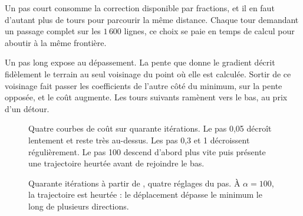 Un pas court consomme la correction disponible par fractions, et il en faut
d'autant plus de tours pour parcourir la même distance. Chaque tour demandant un
passage complet sur les $1\,600$ lignes, ce choix se paie en temps de calcul pour
aboutir à la même frontière.

Un pas long expose au dépassement. La pente que donne le gradient décrit
fidèlement le terrain au seul voisinage du point où elle est calculée. Sortir de
ce voisinage fait passer les coefficients de l'autre côté du minimum, sur la
pente opposée, et le coût augmente. Les tours suivants ramènent vers le bas, au
prix d'un détour.

\begin{figure}[htbp]
\centering
\begin{graphique}{Quatre courbes de coût sur quarante itérations. Le pas 0,05 décroît lentement et reste très au-dessus. Les pas 0,3 et 1 décroissent régulièrement. Le pas 100 descend d'abord plus vite puis présente une trajectoire heurtée avant de rejoindre le bas.}
\end{graphique}
\caption{Quarante itérations à partir de \Mzero, quatre réglages du pas. À
$\alpha=100$, la trajectoire est heurtée : le déplacement dépasse le minimum le
long de plusieurs directions.}
\label{fig:ann-opt-alpha-reel}
\end{figure}
\FloatBarrier

